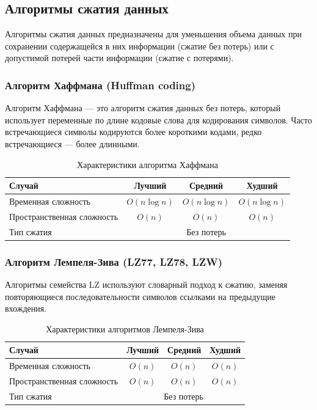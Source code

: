 \documentclass[a4paper,12pt]{article}
\begin{document}
\subsection{Алгоритмы сжатия данных}
\label{subsec:алгоритмы-сжатия-данных}

Алгоритмы сжатия данных предназначены для уменьшения объема данных при сохранении содержащейся в них информации (сжатие без потерь) или с допустимой потерей части информации (сжатие с потерями).

\subsubsection{Алгоритм Хаффмана (Huffman coding)}
\label{subsubsec:алгоритм-хаффмана-huffman-coding}

Алгоритм Хаффмана --- это алгоритм сжатия данных без потерь, который использует переменные по длине кодовые слова для кодирования символов. Часто встречающиеся символы кодируются более короткими кодами, редко встречающиеся --- более длинными.

\begin{table}[H]
    \centering
    \begin{tabular}{|l|c|c|c|}
        \hline
        Случай & Лучший & Средний & Худший \\
        \hline
        Временная сложность & $O(n \log n)$ & $O(n \log n)$ & $O(n \log n)$ \\
        \hline
        Пространственная сложность & $O(n)$ & $O(n)$ & $O(n)$ \\
        \hline
        Тип сжатия & \multicolumn{3}{c|}{Без потерь} \\
        \hline
    \end{tabular}
    \caption{Характеристики алгоритма Хаффмана}
\end{table}

\subsubsection{Алгоритм Лемпеля-Зива (LZ77, LZ78, LZW)}
\label{subsubsec:алгоритм-лемпеля-зива-lz77-lz78-lzw}

Алгоритмы семейства LZ используют словарный подход к сжатию, заменяя повторяющиеся последовательности символов ссылками на предыдущие вхождения.

\begin{table}[H]
    \centering
    \begin{tabular}{|l|c|c|c|}
        \hline
        Случай & Лучший & Средний & Худший \\
        \hline
        Временная сложность & $O(n)$ & $O(n)$ & $O(n)$ \\
        \hline
        Пространственная сложность & $O(n)$ & $O(n)$ & $O(n)$ \\
        \hline
        Тип сжатия & \multicolumn{3}{c|}{Без потерь} \\
        \hline
    \end{tabular}
    \caption{Характеристики алгоритмов Лемпеля-Зива}
\end{table}
\end{document}
